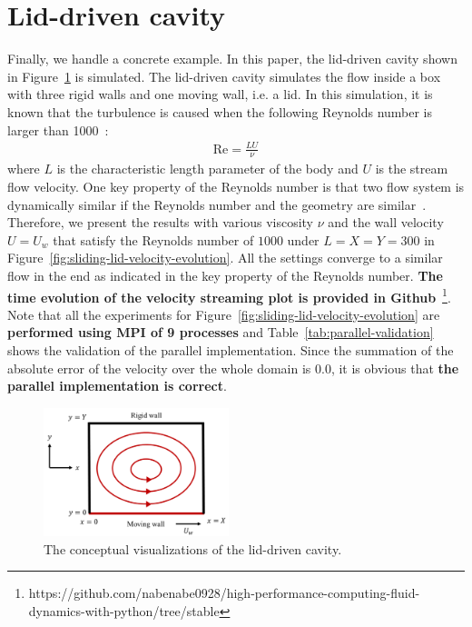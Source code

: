 \section{Lid-driven cavity}
Finally, we handle a concrete example.
In this paper, the lid-driven cavity shown in Figure~\ref{lid-driven-cavity-conceptual} is simulated.
The lid-driven cavity simulates the flow inside a box with
three rigid walls and one moving wall, i.e. a lid.
In this simulation, it is known that the turbulence is caused 
when the following Reynolds number is larger than 1000~\cite{chiang1998effect}:
\begin{equation}
\begin{aligned}
  \text{Re} = \frac{LU}{\nu}
\end{aligned}
\end{equation}
where $L$ is the characteristic length parameter
of the body and $U$ is the stream flow velocity.
One key property of the Reynolds number is that two flow system
is dynamically similar if the Reynolds number and the geometry are similar~\cite{kundu2008fluid}.
Therefore, we present the results with various 
viscosity $\nu$ and the wall velocity $U = U_w$ that 
satisfy the Reynolds number of $1000$ under $L = X = Y = 300$
in Figure~\ref{fig:sliding-lid-velocity-evolution}.
All the settings converge to a similar flow in the end
as indicated in the key property of the Reynolds number.
{\bf The time evolution of the velocity streaming plot is provided in
Github}~\footnote{https://github.com/nabenabe0928/high-performance-computing-fluid-dynamics-with-python/tree/stable}.
Note that all the experiments for Figure~\ref{fig:sliding-lid-velocity-evolution}
are {\bf performed using MPI of 9 processes}
and Table~\ref{tab:parallel-validation}
shows the validation of the parallel implementation.
Since the summation of the absolute error of the velocity over the whole domain
is $0.0$, it is obvious that {\bf the parallel implementation is correct}.

\begin{figure}[t]
  \vspace{-7mm}
  \centering
  \includegraphics[width=0.48\textwidth]{imgs/lid-driven-cavity.pdf}
  \vspace{-3mm}
  \caption{The conceptual visualizations of the lid-driven cavity.}
  \label{lid-driven-cavity-conceptual}
  \vspace{-3mm}
\end{figure}

